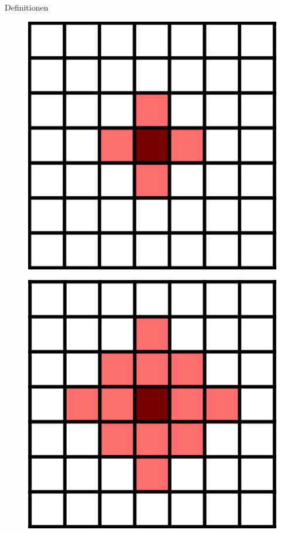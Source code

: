 \documentclass[aspectratio=169]{beamer}
\begin{document}
\begin{frame}{Definitionen}
\begin{multicols*}{2}
      \begin{multicols*}{2}
      \begin{figure}[H]
        \centering
        \includegraphics[width = 0.28 \textheight]{von_Neumann_1.png}
      \end{figure}

      \begin{figure}[H]
        \centering
        \includegraphics[width = 0.28 \textheight]{von_Neumann_2.png}
      \end{figure}


\end{multicols*}
\end{multicols*}
\end{frame}
\end{document}
